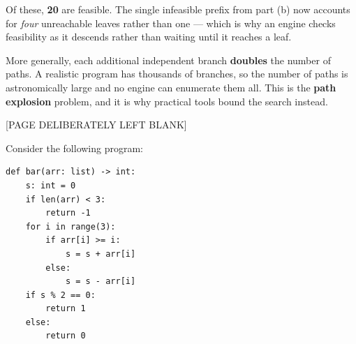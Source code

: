 \documentclass[addpoints]{exam}
\newcommand{\Code}[1]{\texttt{#1}}
\begin{document}
\begin{questions}
\begin{parts}
\begin{solutionorbox}[3in]
    Of these, \textbf{20} are feasible. The single infeasible prefix
    from part (b) now accounts for \emph{four} unreachable leaves
    rather than one --- which is why an engine checks feasibility as it
    descends rather than waiting until it reaches a leaf.

    More generally, each additional independent branch \textbf{doubles}
    the number of paths. A realistic program has thousands of branches,
    so the number of paths is astronomically large and no engine can
    enumerate them all. This is the \textbf{path explosion} problem,
    and it is why practical tools bound the search instead.
  \end{solutionorbox}

\end{parts}

\newpage
\begin{center}
  [PAGE DELIBERATELY LEFT BLANK]
\end{center}
\newpage


\question Consider the following program: \vspace{-.3cm}
  \begin{verbatim}
def bar(arr: list) -> int:
    s: int = 0
    if len(arr) < 3:
        return -1
    for i in range(3):
        if arr[i] >= i:
            s = s + arr[i]
        else:
            s = s - arr[i]
    if s % 2 == 0:
        return 1
    else:
        return 0
\end{verbatim}
\end{questions}
\end{document}
